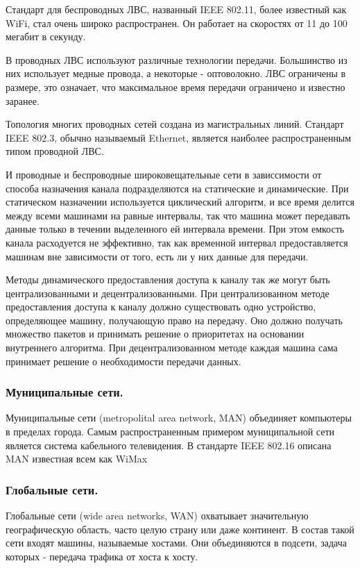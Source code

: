 \documentclass[12pt]{report}
\begin{document}
    Стандарт для беспроводных ЛВС, названный IEEE 802.11, более известный как WiFi, стал очень широко распространен. Он работает на скоростях от 11 до 100 мегабит в секунду.

    В проводных ЛВС используют различные технологии передачи. Большинство из них использует медные провода, а некоторые - оптоволокно. ЛВС ограничены в размере, это означает, что максимальное время передачи ограничено и известно заранее.

    Топология многих проводных сетей создана из магистральных линий. Стандарт IEEE 802.3, обычно называемый Ethernet, является наиболее распространенным типом проводной ЛВС.

    И проводные и беспроводные широковещательные сети в зависсимости от способа назначения канала подразделяются на статические и динамические. При статическом назначении используется циклический алгоритм, и все время делится между всеми машинами на равные интервалы, так что машина может передавать данные только в течении выделенного ей интервала времени. При этом емкость канала расходуется не эффективно, так как временной интервал предоставляется машинам вне зависимости от того, есть ли у них данные для передачи.

    Методы динамического предоставления доступа к каналу так же могут быть централизованными и децентрализованными. При централизованном методе предоставления доступа к каналу должно существовать одно устройство, определяющее машину, получающую право на передачу. Оно должно получать множество пакетов и принимать решение о приоритетах на основании внутреннего алгоритма. При децентрализованном методе каждая машина сама принимает решение о необходимости передачи данных.


    \subsubsection{Муниципальные сети. }
    Муниципальные сети (metropolital area network, MAN) объединяет компьютеры в пределах города. Самым распространенным примером муниципальной сети является система кабельного телевидения. В стандарте IEEE 802.16 описана MAN известная всем как WiMax

    \subsubsection{Глобальные сети. }

    Глобальные сети (wide area networks, WAN) охватывает значительную географическую область, часто целую страну или даже континент. В состав такой сети входят машины, называемые хостами. Они объединяются в подсети, задача которых - передача трафика от хоста к хосту.
\end{document}
